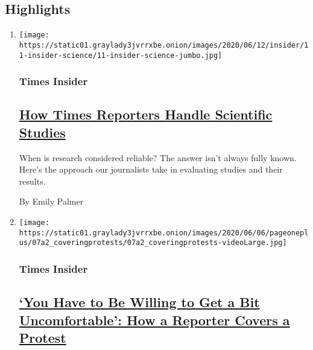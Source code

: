 \hypertarget{highlights}{%
\subsection{Highlights}\label{highlights}}

\begin{enumerate}
\def\labelenumi{\arabic{enumi}.}
\item
  \texttt{[image: https://static01.graylady3jvrrxbe.onion/images/2020/06/12/insider/11-insider-science/11-insider-science-jumbo.jpg]}

  \hypertarget{times-insider}{%
  \subsubsection{Times Insider}\label{times-insider}}

  \hypertarget{how-times-reporters-handle-scientific-studies}{%
  \subsection{\texorpdfstring{\href{/2020/06/09/insider/reporters-scientific-studies.html}{How
  Times Reporters Handle Scientific
  Studies}}{How Times Reporters Handle Scientific Studies}}\label{how-times-reporters-handle-scientific-studies}}

  When is research considered reliable? The answer isn't always fully
  known. Here's the approach our journalists take in evaluating studies
  and their results.

  By Emily Palmer
\item
  \texttt{[image: https://static01.graylady3jvrrxbe.onion/images/2020/06/06/pageoneplus/07a2\_coveringprotests/07a2\_coveringprotests-videoLarge.jpg]}

  \hypertarget{times-insider-1}{%
  \subsubsection{Times Insider}\label{times-insider-1}}

  \hypertarget{you-have-to-be-willing-to-get-a-bit-uncomfortable-how-a-reporter-covers-a-protest}{%
  \subsection{\texorpdfstring{\href{/2020/06/06/reader-center/covering-protests.html}{`You
  Have to Be Willing to Get a Bit Uncomfortable': How a Reporter Covers
  a
  Protest}}{`You Have to Be Willing to Get a Bit Uncomfortable': How a Reporter Covers a Protest}}\label{you-have-to-be-willing-to-get-a-bit-uncomfortable-how-a-reporter-covers-a-protest}}


\end{enumerate}
